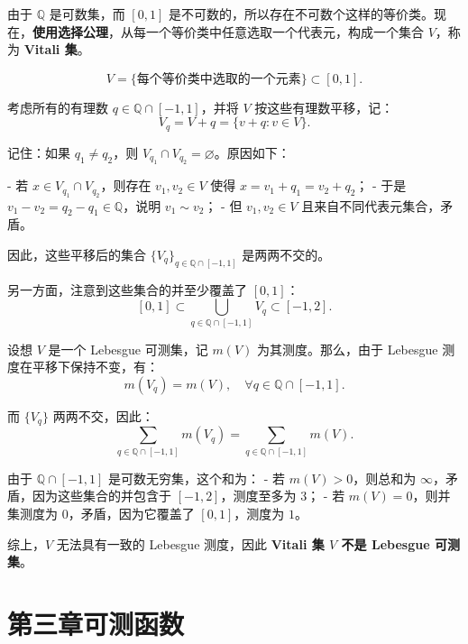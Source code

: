\documentclass[lang=cn,10pt]{elegantbook}
\begin{document}
由于 $\mathbb{Q}$ 是可数集，而 $[0,1]$ 是不可数的，所以存在不可数个这样的等价类。现在，\textbf{使用选择公理}，从每一个等价类中任意选取一个代表元，构成一个集合 $V$，称为 \textbf{Vitali 集}。

\[
V = \{ \text{每个等价类中选取的一个元素} \} \subset [0,1].
\]

考虑所有的有理数 $q \in \mathbb{Q} \cap [-1,1]$，并将 $V$ 按这些有理数平移，记：
\[
V_q = V + q = \{ v + q : v \in V \}.
\]

记住：如果 $q_1 \ne q_2$，则 $V_{q_1} \cap V_{q_2} = \varnothing$。原因如下：

- 若 $x \in V_{q_1} \cap V_{q_2}$，则存在 $v_1, v_2 \in V$ 使得 $x = v_1 + q_1 = v_2 + q_2$；
- 于是 $v_1 - v_2 = q_2 - q_1 \in \mathbb{Q}$，说明 $v_1 \sim v_2$；
- 但 $v_1, v_2 \in V$ 且来自不同代表元集合，矛盾。

因此，这些平移后的集合 $\{V_q\}_{q \in \mathbb{Q} \cap [-1,1]}$ 是两两不交的。

另一方面，注意到这些集合的并至少覆盖了 $[0,1]$：
\[
[0,1] \subset \bigcup_{q \in \mathbb{Q} \cap [-1,1]} V_q \subset [-1,2].
\]

设想 $V$ 是一个 Lebesgue 可测集，记 $m(V)$ 为其测度。那么，由于 Lebesgue 测度在平移下保持不变，有：
\[
m(V_q) = m(V), \quad \forall q \in \mathbb{Q} \cap [-1,1].
\]

而 $\{V_q\}$ 两两不交，因此：
\[
\sum_{q \in \mathbb{Q} \cap [-1,1]} m(V_q) = \sum_{q \in \mathbb{Q} \cap [-1,1]} m(V).
\]

由于 $\mathbb{Q} \cap [-1,1]$ 是可数无穷集，这个和为：
- 若 $m(V) > 0$，则总和为 $\infty$，矛盾，因为这些集合的并包含于 $[-1,2]$，测度至多为 $3$；
- 若 $m(V) = 0$，则并集测度为 $0$，矛盾，因为它覆盖了 $[0,1]$，测度为 $1$。

综上，$V$ 无法具有一致的 Lebesgue 测度，因此 \textbf{Vitali 集 $V$ 不是 Lebesgue 可测集}。
\chapter{第三章可测函数}
\end{document}

